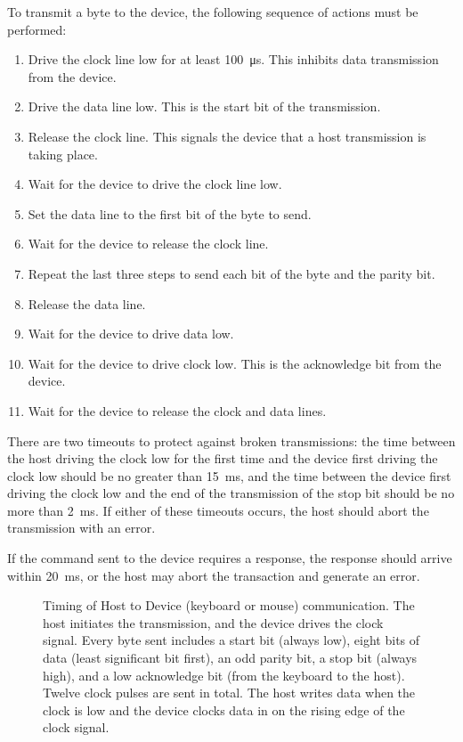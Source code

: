 To transmit a byte to the device, the following sequence of actions must be
performed:

\begin{enumerate}
\item Drive the clock line low for at least 100~μs. This inhibits data
transmission from the device.
\item Drive the data line low. This is the start bit of the transmission.
\item Release the clock line. This signals the device that a host transmission
  is taking place. 
\item Wait for the device to drive the clock line low.
\item Set the data line to the first bit of the byte to send.
\item Wait for the device to release the clock line.
\item Repeat the last three steps to send each bit of the byte and the parity bit.
\item Release the data line.
\item Wait for the device to drive data low.
\item Wait for the device to drive clock low. This is the acknowledge bit from the device.
\item Wait for the device to release the clock and data lines.
\end{enumerate}

There are two timeouts to protect against broken transmissions: the time
between the host driving the clock low for the first time and the device first
driving the clock low should be no greater than 15~ms, and the time between the
device first driving the clock low and the end of the transmission of the stop
bit should be no more than 2~ms. If either of these timeouts occurs, the host
should abort the transmission with an error.

If the command sent to the device requires a response, the response should
arrive within 20~ms, or the host may abort the transaction and generate an
error.

\begin{figure*}
\centering
{}
\caption[Host to Keyboard/Mouse Communication]{\label{fig:kbd-host-to-kbd}
  Timing of Host to Device (keyboard or mouse) communication. The host
  initiates the transmission, and the device drives the clock signal. Every
  byte sent includes a start bit (always low), eight bits of data (least
  significant bit first), an odd parity bit, a stop bit (always high), and a
  low acknowledge bit (from the keyboard to the host). Twelve clock pulses are
  sent in total. The host writes data when the clock is low and the device
  clocks data in on the rising edge of the clock signal.}
\end{figure*}


